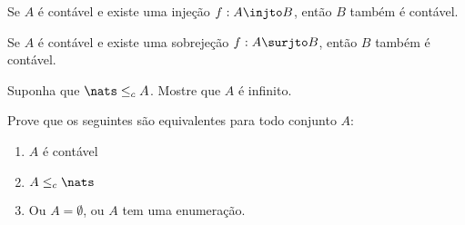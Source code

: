 \begin{exercise}
	Se $A$ é contável e existe uma injeção $f : A \injto B$, então $B$ também é contável.
\end{exercise}

\begin{exercise}
	Se $A$ é contável e existe uma sobrejeção $f : A \surjto B$, então $B$ também é contável.
\end{exercise}

\begin{exercise}
	Suponha que $\nats \leq_c A$. Mostre que $A$ é infinito.
\end{exercise}

\begin{exercise}
	Prove que os seguintes são equivalentes para todo conjunto $A$:
	\begin{enumerate}[(1)]
		\item $A$ é contável
		\item $A \leq_c \nats$
		\item Ou $A = \emptyset$, ou  $A$ tem uma enumeração.
	\end{enumerate}
\end{exercise}
